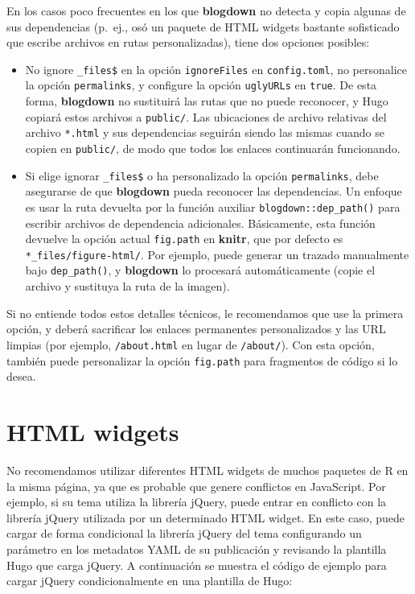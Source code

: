 \documentclass[12pt,]{krantz}
\theoremstyle{definition}
\theoremstyle{definition}
\theoremstyle{definition}
\theoremstyle{remark}
\begin{document}
En los casos poco frecuentes en los que \textbf{blogdown} no detecta y
copia algunas de sus dependencias (p.~ej., osó un paquete de HTML
widgets bastante sofisticado que escribe archivos en rutas
personalizadas), tiene dos opciones posibles:

\begin{itemize}
\item
  No ignore \texttt{\_files\$} en la opción \texttt{ignoreFiles} en
  \texttt{config.toml}, no personalice la opción \texttt{permalinks}, y
  configure la opción \texttt{uglyURLs} en \texttt{true}. De esta forma,
  \textbf{blogdown} no sustituirá las rutas que no puede reconocer, y
  Hugo copiará estos archivos a \texttt{public/}. Las ubicaciones de
  archivo relativas del archivo \texttt{*.html} y sus dependencias
  seguirán siendo las mismas cuando se copien en \texttt{public/}, de
  modo que todos los enlaces continuarán funcionando.
\item
  Si elige ignorar \texttt{\_files\$} o ha personalizado la opción
  \texttt{permalinks}, debe asegurarse de que \textbf{blogdown} pueda
  reconocer las dependencias. Un enfoque es usar la ruta devuelta por la
  función auxiliar \texttt{blogdown::dep\_path()} para escribir archivos
  de dependencia adicionales. Básicamente, esta función devuelve la
  opción actual \texttt{fig.path} en \textbf{knitr}, que por defecto es
  \texttt{*\_files/figure-html/}. Por ejemplo, puede generar un trazado
  manualmente bajo \texttt{dep\_path()}, y \textbf{blogdown} lo
  procesará automáticamente (copie el archivo y sustituya la ruta de la
  imagen).
\end{itemize}

Si no entiende todos estos detalles técnicos, le recomendamos que use la
primera opción, y deberá sacrificar los enlaces permanentes
personalizados y las URL limpias (por ejemplo, \texttt{/about.html} en
lugar de \texttt{/about/}). Con esta opción, también puede personalizar
la opción \texttt{fig.path} para fragmentos de código si lo desea.

\hypertarget{html-widgets}{%
\section{HTML widgets}\label{html-widgets}}

No recomendamos utilizar diferentes HTML widgets de
muchos paquetes de R en la misma página, ya que es probable que genere
conflictos en JavaScript. Por ejemplo, si su tema utiliza la librería
jQuery, puede entrar en conflicto con la librería jQuery utilizada por
un determinado HTML widget. En este caso, puede cargar de forma
condicional la librería jQuery del tema configurando un
parámetro en los metadatos YAML de su publicación y revisando la
plantilla Hugo que carga jQuery. A continuación se muestra el código de
ejemplo para cargar jQuery condicionalmente en una plantilla de Hugo:
\end{document}
